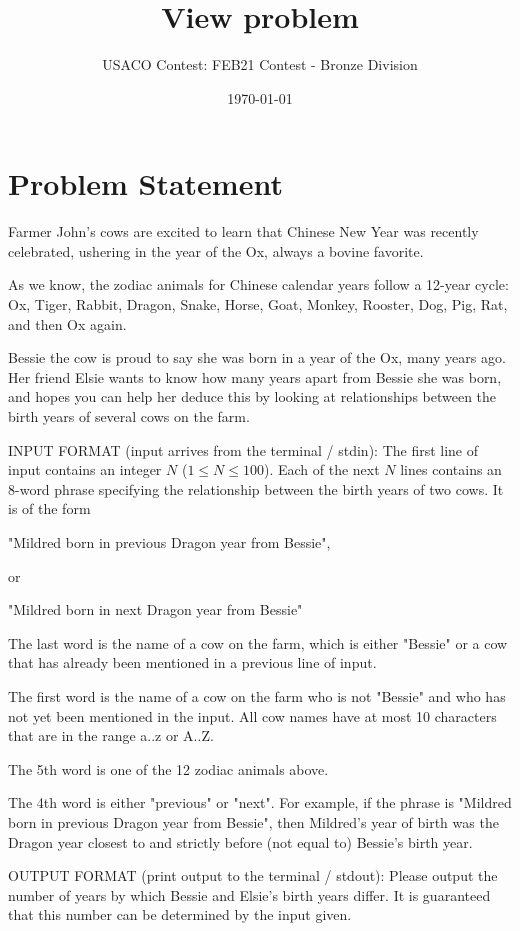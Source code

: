 \documentclass[12pt]{article}
\title{View problem}
\author{USACO Contest: FEB21 Contest - Bronze Division}
\date{\today}
\begin{document}
\maketitle

\section*{Problem Statement}

Farmer John's cows are excited to learn that Chinese New Year was recently 
celebrated, ushering in the year of the Ox, always a bovine favorite.

As we know, the zodiac animals for Chinese calendar years follow a 12-year
cycle: Ox, Tiger, Rabbit, Dragon, Snake, Horse, Goat, Monkey, Rooster, Dog, Pig,
Rat, and then Ox again.  

Bessie the cow is proud to say she was born in a year of the Ox, many years ago.
Her friend Elsie wants to know how many years apart from Bessie she was born,
and hopes you can help her deduce this by looking at relationships between the 
birth years of several cows on the farm.

INPUT FORMAT (input arrives from the terminal / stdin):
The first line of input contains an integer $N$ ($1 \leq N \leq 100$).  Each of
the next $N$ lines contains an 8-word phrase specifying the relationship between
the birth years of two cows.  It is of the form

"Mildred born in previous Dragon year from Bessie", 

or

"Mildred born in next Dragon year from Bessie"

The last word is the name of a cow on the farm, which is either "Bessie" or a
cow that has already been mentioned in a previous line of input.

The first word is the name of a cow on the farm who is not "Bessie" and who  has
not yet been mentioned  in the input.  All cow names have at most 10 characters
that are in the range a..z or A..Z.

The 5th word is one of the 12 zodiac animals above.

The 4th word is either "previous" or "next".  For example, if the phrase is
"Mildred born in previous Dragon year from Bessie", then Mildred's year of 
birth was the Dragon year closest to and strictly before (not equal to) 
Bessie's birth year.

OUTPUT FORMAT (print output to the terminal / stdout):
Please output the number of years by which Bessie and Elsie's birth years differ.
It is guaranteed that this number can be determined by the input given.
\end{document}
